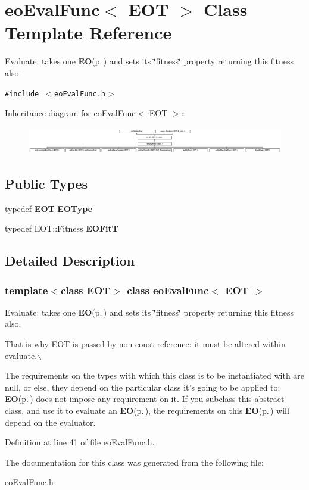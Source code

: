 \section{eo\-Eval\-Func$<$ EOT $>$ Class Template Reference}
\label{classeo_eval_func}
Evaluate: takes one {\bf EO}{\rm (p.\,\pageref{class_e_o})} and sets its \char`\"{}fitness\char`\"{} property returning this fitness also.  


{\tt \#include $<$eo\-Eval\-Func.h$>$}

Inheritance diagram for eo\-Eval\-Func$<$ EOT $>$::\begin{figure}[H]
\begin{center}
\leavevmode
\includegraphics[height=1.22137cm]{classeo_eval_func}
\end{center}
\end{figure}
\subsection*{Public Types}
\begin{CompactItemize}
\item 
typedef {\bf EOT} {\bf EOType}\label{classeo_eval_func_w0}

\item 
typedef EOT::Fitness {\bf EOFit\-T}\label{classeo_eval_func_w1}

\end{CompactItemize}


\subsection{Detailed Description}
\subsubsection*{template$<$class EOT$>$ class eo\-Eval\-Func$<$ EOT $>$}

Evaluate: takes one {\bf EO}{\rm (p.\,\pageref{class_e_o})} and sets its \char`\"{}fitness\char`\"{} property returning this fitness also. 

That is why EOT is passed by non-const reference: it must be altered within evaluate.$\backslash$

The requirements on the types with which this class is to be instantiated with are null, or else, they depend on the particular class it's going to be applied to; {\bf EO}{\rm (p.\,\pageref{class_e_o})} does not impose any requirement on it. If you subclass this abstract class, and use it to evaluate an {\bf EO}{\rm (p.\,\pageref{class_e_o})}, the requirements on this {\bf EO}{\rm (p.\,\pageref{class_e_o})} will depend on the evaluator. 



Definition at line 41 of file eo\-Eval\-Func.h.

The documentation for this class was generated from the following file:\begin{CompactItemize}
\item 
eo\-Eval\-Func.h\end{CompactItemize}
